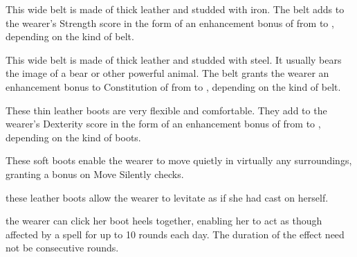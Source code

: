  This wide belt is made of thick leather and studded with iron. The belt adds to the wearer's Strength score in the form of an enhancement bonus of from  to , depending on the kind of belt.

 This wide belt is made of thick leather and studded with steel. It usually bears the image of a bear or other powerful animal. The belt grants the wearer an enhancement bonus to Constitution of from  to , depending on the kind of belt.


 These thin leather boots are very flexible and comfortable. They add to the wearer's Dexterity score in the form of an enhancement bonus of from  to , depending on the kind of boots.

 These soft boots enable the wearer to move quietly in virtually any surroundings, granting a   bonus on Move Silently checks.

  these leather boots allow the wearer to levitate as if she had cast  on herself.

  the wearer can click her boot heels together, enabling her to act as though affected by a  spell for up to 10 rounds each day. The duration of the effect need not be consecutive rounds.

